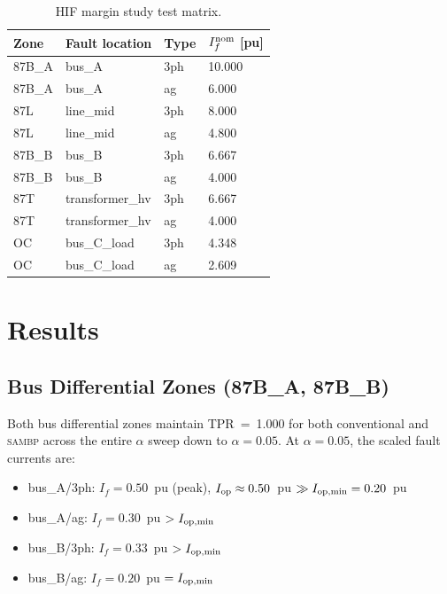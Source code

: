 \documentclass[12pt,a4paper]{article}
\newcommand{\SAMBP}{\textsc{sambp}}
\newcommand{\Iop}{I_{\rm op}}
\newcommand{\Iopmin}{I_{\rm op,min}}
\begin{document}
\begin{table}[ht]
\centering
\caption{HIF margin study test matrix.}
\label{tab:matrix}
\begin{tabular}{llll}
\toprule
Zone & Fault location & Type & $I_f^{\rm nom}$ [pu] \\
\midrule
87B\_A & bus\_A & 3ph & 10.000 \\
87B\_A & bus\_A & ag  & 6.000  \\
87L   & line\_mid & 3ph & 8.000  \\
87L   & line\_mid & ag  & 4.800  \\
87B\_B & bus\_B & 3ph & 6.667  \\
87B\_B & bus\_B & ag  & 4.000  \\
87T   & transformer\_hv & 3ph & 6.667  \\
87T   & transformer\_hv & ag  & 4.000  \\
OC    & bus\_C\_load & 3ph & 4.348  \\
OC    & bus\_C\_load & ag  & 2.609  \\
\bottomrule
\end{tabular}
\end{table}

\section{Results}

\subsection{Bus Differential Zones (87B\_A, 87B\_B)}

Both bus differential zones maintain TPR~=~1.000 for both conventional
and \SAMBP{} across the entire $\alpha$ sweep down to $\alpha = 0.05$.
At $\alpha = 0.05$, the scaled fault currents are:

\begin{itemize}[noitemsep]
  \item bus\_A/3ph: $I_f = 0.50$~pu (peak), $\Iop \approx 0.50$~pu
    $\gg \Iopmin = 0.20$~pu
  \item bus\_A/ag: $I_f = 0.30$~pu $> \Iopmin$
  \item bus\_B/3ph: $I_f = 0.33$~pu $> \Iopmin$
  \item bus\_B/ag: $I_f = 0.20$~pu $= \Iopmin$
\end{itemize}
\end{document}
